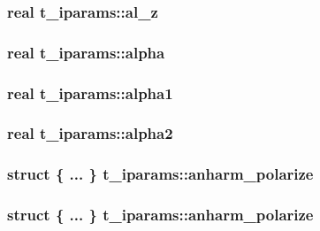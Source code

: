 \hypertarget{uniont__iparams_a73614f5abd375b70a86d6494d1df4a81}{
\subsubsection[{al\-\_\-z}]{\setlength{\rightskip}{0pt plus 5cm}real {\bf t\-\_\-iparams\-::al\-\_\-z}}}\label{uniont__iparams_a73614f5abd375b70a86d6494d1df4a81}
\hypertarget{uniont__iparams_a1ba2fc2db2b806987876aa29c1702db4}{
\subsubsection[{alpha}]{\setlength{\rightskip}{0pt plus 5cm}real {\bf t\-\_\-iparams\-::alpha}}}\label{uniont__iparams_a1ba2fc2db2b806987876aa29c1702db4}
\hypertarget{uniont__iparams_a4a17aad446da736ce31b69de32ec45ee}{
\subsubsection[{alpha1}]{\setlength{\rightskip}{0pt plus 5cm}real {\bf t\-\_\-iparams\-::alpha1}}}\label{uniont__iparams_a4a17aad446da736ce31b69de32ec45ee}
\hypertarget{uniont__iparams_a97862f1feb358ba5895a61cebf5a8063}{
\subsubsection[{alpha2}]{\setlength{\rightskip}{0pt plus 5cm}real {\bf t\-\_\-iparams\-::alpha2}}}\label{uniont__iparams_a97862f1feb358ba5895a61cebf5a8063}
\hypertarget{uniont__iparams_adb8397e3d4bd3274fe8d505b04b035a6}{
\subsubsection[{anharm\-\_\-polarize}]{\setlength{\rightskip}{0pt plus 5cm}struct \{ ... \}   {\bf t\-\_\-iparams\-::anharm\-\_\-polarize}}}\label{uniont__iparams_adb8397e3d4bd3274fe8d505b04b035a6}
\hypertarget{uniont__iparams_a14fcc8a56374ba4b43183380124f8424}{
\subsubsection[{anharm\-\_\-polarize}]{\setlength{\rightskip}{0pt plus 5cm}struct \{ ... \}   {\bf t\-\_\-iparams\-::anharm\-\_\-polarize}}}\label{uniont__iparams_a14fcc8a56374ba4b43183380124f8424}
